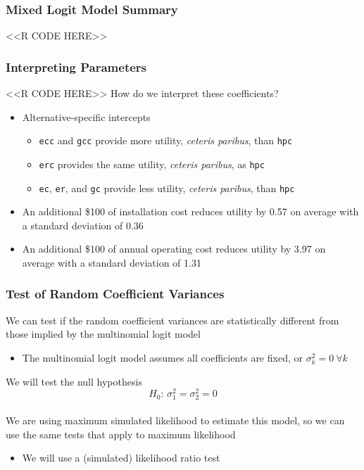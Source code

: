 \documentclass{beamer}
\begin{document}
\begin{frame}[fragile]\frametitle{Mixed Logit Model Summary}
	\vspace{1ex}
    <<R CODE HERE>>
\end{frame}

\begin{frame}[fragile]\frametitle{Interpreting Parameters}
    <<R CODE HERE>>
    \vspace{2ex}
    How do we interpret these coefficients?
    \begin{itemize}
    	\item Alternative-specific intercepts
    	\begin{itemize}
    		\item \texttt{ecc} and \texttt{gcc} provide more utility, \emph{ceteris paribus}, than \texttt{hpc}
	        \item \texttt{erc} provides the same utility, \emph{ceteris paribus}, as \texttt{hpc}
	        \item \texttt{ec}, \texttt{er}, and \texttt{gc} provide less utility, \emph{ceteris paribus}, than \texttt{hpc}
    	\end{itemize}
        \item An additional \$100 of installation cost reduces utility by 0.57 on average with a standard deviation of 0.36
        \item An additional \$100 of annual operating cost reduces utility by 3.97 on average with a standard deviation of 1.31
    \end{itemize}
\end{frame}

\begin{frame}\frametitle{Test of Random Coefficient Variances}
    We can test if the random coefficient variances are statistically different from those implied by the multinomial logit model
    \begin{itemize}
    	\item The multinomial logit model assumes all coefficients are fixed, or $\sigma_k^2 = 0 ~\forall k$
    \end{itemize}
    \vspace{3ex}
    We will test the null hypothesis
    $$H_0 \text{: } \sigma_1^2 = \sigma_2^2 = 0$$ \\
    \vspace{3ex}
    We are using maximum simulated likelihood to estimate this model, so we can use the same tests that apply to maximum likelihood
    \begin{itemize}
    	\item We will use a (simulated) likelihood ratio test
    \end{itemize}
\end{frame}
\end{document}
